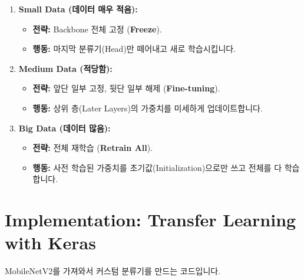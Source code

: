 \documentclass[11pt,a4paper]{book}
\theoremstyle{definition}
\begin{document}
\begin{strategybox}[title={데이터 규모별 전략}]
\begin{enumerate}
    \item \textbf{Small Data (데이터 매우 적음):}
    \begin{itemize}
        \item \textbf{전략:} Backbone 전체 고정 (\textbf{Freeze}).
        \item \textbf{행동:} 마지막 분류기(Head)만 떼어내고 새로 학습시킵니다.
    \end{itemize}
    
    \item \textbf{Medium Data (적당함):}
    \begin{itemize}
        \item \textbf{전략:} 앞단 일부 고정, 뒷단 일부 해제 (\textbf{Fine-tuning}).
        \item \textbf{행동:} 상위 층(Later Layers)의 가중치를 미세하게 업데이트합니다.
    \end{itemize}
    
    \item \textbf{Big Data (데이터 많음):}
    \begin{itemize}
        \item \textbf{전략:} 전체 재학습 (\textbf{Retrain All}).
        \item \textbf{행동:} 사전 학습된 가중치를 초기값(Initialization)으로만 쓰고 전체를 다 학습합니다.
    \end{itemize}
\end{enumerate}
\end{strategybox}

\section{Implementation: Transfer Learning with Keras}

MobileNetV2를 가져와서 커스텀 분류기를 만드는 코드입니다.
\end{document}
